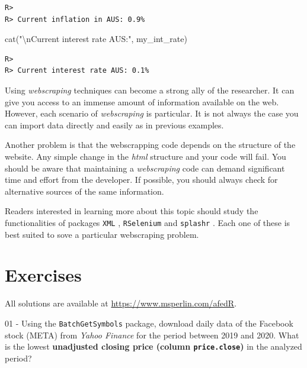 \documentclass[
  12pt,
]{book}
\newenvironment{Shaded}{\begin{snugshade}}{\end{snugshade}}
\newcommand{\FunctionTok}[1]{\textcolor[rgb]{0,0,0}{#1}}
\newcommand{\NormalTok}[1]{#1}
\newcommand{\SpecialCharTok}[1]{\textcolor[rgb]{0,0,0}{#1}}
\newcommand{\StringTok}[1]{\textcolor[rgb]{0.5,0.5,0.5}{#1}}
\begin{document}
\begin{verbatim}
R> 
R> Current inflation in AUS: 0.9%
\end{verbatim}

\begin{Shaded}
\begin{Highlighting}[]
\FunctionTok{cat}\NormalTok{(}\StringTok{"}\SpecialCharTok{\textbackslash{}n}\StringTok{Current interest rate AUS:"}\NormalTok{, my\_int\_rate)}
\end{Highlighting}
\end{Shaded}

\begin{verbatim}
R> 
R> Current interest rate AUS: 0.1%
\end{verbatim}

Using \emph{webscraping} techniques can become a strong ally of the researcher. It can give you access to an immense amount of information available on the web. However, each scenario of \emph{webscraping} is particular. It is not always the case you can import data directly and easily as in previous examples.

Another problem is that the webscrapping code depends on the structure of the website. Any simple change in the \emph{html} structure and your code will fail. You should be aware that maintaining a \emph{webscraping} code can demand significant time and effort from the developer. If possible, you should always check for alternative sources of the same information.

Readers interested in learning more about this topic should study the functionalities of packages \texttt{XML} \citep{R-XML}, \texttt{RSelenium} \citep{R-RSelenium} and \texttt{splashr} \citep{R-splashr}. Each one of these is best suited to sove a particular webscraping problem.    

\hypertarget{exercises-2}{%
\section{Exercises}\label{exercises-2}}

All solutions are available at \url{https://www.msperlin.com/afedR}.

01 -
Using the \texttt{BatchGetSymbols} package, download daily data of the Facebook stock (META) from \emph{Yahoo Finance} for the period between 2019 and 2020. What is the lowest \textbf{unadjusted closing price (column \texttt{price.close})} in the analyzed period?
\end{document}
